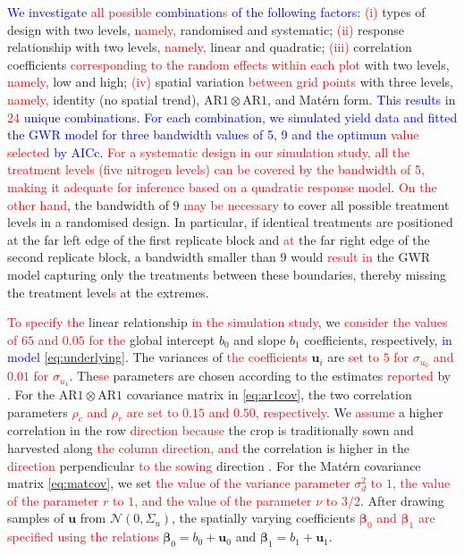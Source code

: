 \documentclass[a4paper]{article} 	%
\newcommand{\Matern}{Mat\'ern }
\newcommand{\N}{\mathcal{N}}
\newcommand{\AR}{\mathrm{AR1}}
\newcommand{\revision}[1]{\textcolor{red}{#1}}
\newcommand{\zc}[1]{\textcolor{blue}{#1}}
\begin{document}
\zc{We investigate \revision{all possible} combination\revision{s} of the following factors}: \revision{(i)} types of design with two levels, \revision{namely,} randomised and systematic; \revision{(ii)} response relationship with two levels, \revision{namely,} linear and quadratic; \revision{(iii)} correlation coefficients \revision{corresponding to the random effects within each plot} with two levels, \revision{namely,} low and high; \revision{(iv)} spatial variation \revision{between grid points} with three levels, \revision{namely,} identity (no spatial trend), $\AR\otimes\AR$, and \Matern form. \zc{This results in \revision{24} unique combinations. For each combination, we simulated yield data and fitted the GWR model for three bandwidth values of 5, 9 and the optimum \revision{value selected} by AICc.} \revision{For a systematic design in our simulation study, all the treatment levels (five nitrogen levels) can be covered by the bandwidth of 5, making it adequate for inference based on a quadratic response model}. \revision{On the other hand}, the bandwidth of 9 \revision{may be necessary} to cover all possible treatment levels in a randomised design. In particular, if identical treatments are positioned at the far left edge of the first replicate block and \revision{at} the far right edge of the second replicate block, a bandwidth smaller than 9 would  \revision{result in} the GWR model capturing only the treatments between these boundaries, thereby missing the treatment level\revision{s} at the extremes.


\revision{To specify the} linear relationship \revision{in the simulation study}, we \revision{consider the values of $65$ and $0.05$ for the} global intercept $b_0$ and slope $b_1$ coefficients, respectively, \zc{in model \eqref{eq:underlying}}. The variances of \revision{the coefficients} $\bm{u}_i$ are \revision{set to $5$ for $\sigma_{u_0}$ and $0.01$ for $\sigma_{u_1}$}. The\revision{se} parameters are chosen according to the estimates \revision{reported} by \textcite{Cao2022Bayesian}. For the $\AR\otimes\AR$ covariance matrix in \eqref{eq:ar1cov}, the two correlation parameters \revision{$\rho_c$ and $\rho_r$ are set to $0.15$ and $0.50$, respectively}. We \revision{assume} a higher correlation in the row \revision{direction because} the crop is traditionally sown and harvested along \revision{the column direction,} \revision{and} the correlation is higher in the \revision{direction} perpendicular \revision{to the sowing} direction \parencite{Marchant2019Establishinga}. For the \Matern covariance matrix \eqref{eq:matcov}, we set \revision{the value of the variance parameter $\sigma_d^2$ to $1$, the value of the parameter $r$ to $1$, and the value of the parameter $\nu$ to $3/2$}. After drawing samples of $\bm{u}$ from $\N(0,\Sigma_u)$, the spatially varying coefficients \revision{$\bm{\beta}_0$ and $\bm{\beta}_1$ are specified using the relations} $\bm{\beta}_0 = b_0 + \bm{u}_0$ and $\bm{\beta}_1 = b_1 + \bm{u}_1$. 
\end{document}
